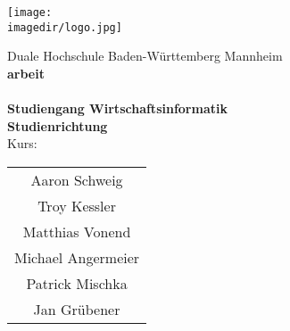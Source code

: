 \begin{titlepage}
	\begin{center}
		\texttt{[image: \\imagedir/logo.jpg]}	
	\end{center}
	\vspace{2em}
	\begin{center}
		{\textsf{\large Duale Hochschule Baden-W\"urttemberg Mannheim}}\\[4em]
		{\textsf{\textbf{\large{\DieArtDerArbeit}arbeit}}}\\[6mm]
		{\textsf{\textbf{\Large{}\DerTitelDerArbeit}}} \\[1.5cm]
		{\textsf{\textbf{\large{}Studiengang Wirtschaftsinformatik}}\\[6mm]
		\textsf{\textbf{Studienrichtung \DieStudienrichtung}}}\\[6mm]
		\textsf{Kurs: \DieKursbezeichnung} \\[3cm]
		\begin{center}
			\begin{table}[h]
				\centering
				\begin{tabular}{c}
					Aaron Schweig \\
					Troy Kessler  \\
					Matthias Vonend  \\
					Michael Angermeier \\
					Patrick Mischka \\
					Jan Grübener \\
				\end{tabular}
			\end{table}
		\end{center}

	\end{center}
\end{titlepage}